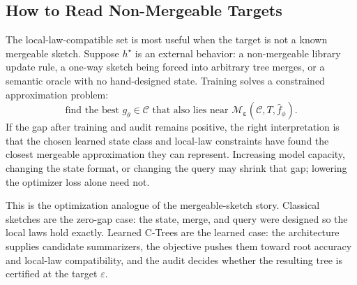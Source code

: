 \subsection{How to Read Non-Mergeable Targets}
\label{app:v7-nonmergeable-targets}

The local-law-compatible set is most useful when the target is not a
known mergeable sketch. Suppose \(h^\star\) is an external behavior: a
non-mergeable library update rule, a one-way sketch being forced into
arbitrary tree merges, or a semantic oracle with no hand-designed
state. Training solves a constrained approximation problem:
\[
  \text{find the best }g_\theta\in\mathcal C
  \text{ that also lies near }
  \mathcal M_{\boldsymbol\varepsilon}(\mathcal C,T,\widehat f_\phi).
\]
If the gap after training and audit remains positive, the right
interpretation is that the chosen learned state class and local-law
constraints have found the closest mergeable approximation they can
represent. Increasing model capacity, changing the state format, or
changing the query may shrink that gap; lowering the optimizer
loss alone need not.

This is the optimization analogue of the mergeable-sketch story.
Classical sketches are the zero-gap case: the state, merge, and query
were designed so the local laws hold exactly. Learned C-Trees are the
learned case: the architecture supplies candidate summarizers, the
objective pushes them toward root accuracy and local-law compatibility,
and the audit decides whether the resulting tree is certified at the
target \(\varepsilon\).

